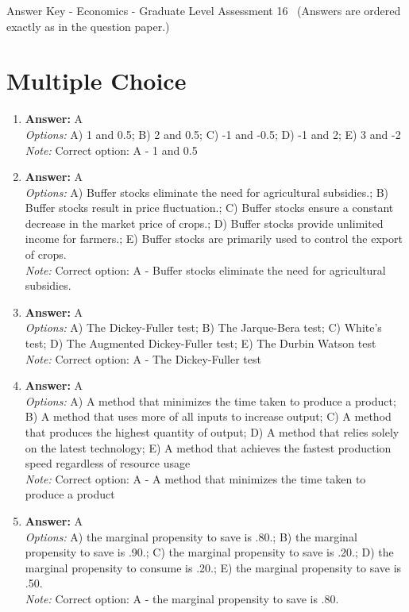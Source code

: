 \documentclass[12pt]{article}
\begin{document}
\begin{center}
Answer Key - Economics - Graduate Level Assessment 16 \
\small (Answers are ordered exactly as in the question paper.)
\end{center}

\section*{Multiple Choice}
\begin{enumerate}[label=\arabic*.]
\item \textbf{Answer:} A
\\ \textit{Options:} A) 1 and 0.5; B) 2 and 0.5; C) -1 and -0.5; D) -1 and 2; E) 3 and -2
\\ \textit{Note:} Correct option: A - 1 and 0.5
\item \textbf{Answer:} A
\\ \textit{Options:} A) Buffer stocks eliminate the need for agricultural subsidies.; B) Buffer stocks result in price fluctuation.; C) Buffer stocks ensure a constant decrease in the market price of crops.; D) Buffer stocks provide unlimited income for farmers.; E) Buffer stocks are primarily used to control the export of crops.
\\ \textit{Note:} Correct option: A - Buffer stocks eliminate the need for agricultural subsidies.
\item \textbf{Answer:} A
\\ \textit{Options:} A) The Dickey-Fuller test; B) The Jarque-Bera test; C) White's test; D) The Augmented Dickey-Fuller test; E) The Durbin Watson test
\\ \textit{Note:} Correct option: A - The Dickey-Fuller test
\item \textbf{Answer:} A
\\ \textit{Options:} A) A method that minimizes the time taken to produce a product; B) A method that uses more of all inputs to increase output; C) A method that produces the highest quantity of output; D) A method that relies solely on the latest technology; E) A method that achieves the fastest production speed regardless of resource usage
\\ \textit{Note:} Correct option: A - A method that minimizes the time taken to produce a product
\item \textbf{Answer:} A
\\ \textit{Options:} A) the marginal propensity to save is .80.; B) the marginal propensity to save is .90.; C) the marginal propensity to save is .20.; D) the marginal propensity to consume is .20.; E) the marginal propensity to save is .50.
\\ \textit{Note:} Correct option: A - the marginal propensity to save is .80.
\end{enumerate}
\end{document}
